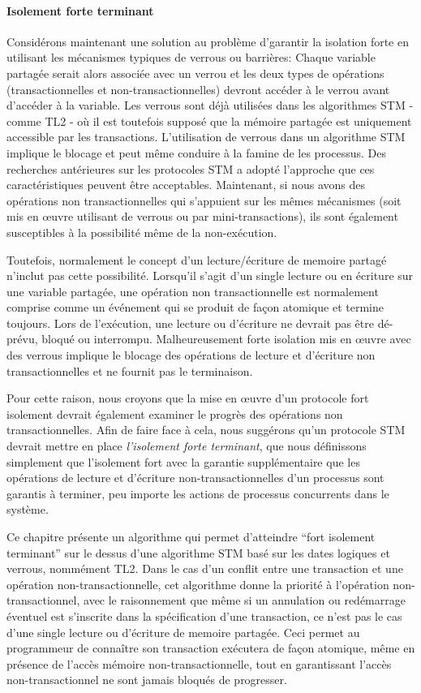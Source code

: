 \paragraph{Isolement forte terminant}

Considérons maintenant une solution au problème d'garantir la isolation forte en utilisant les mécanismes typiques de verrous ou barrières:
Chaque variable partagée serait alors associée avec un verrou et les deux types de opérations (transactionnelles et non-transactionnelles) devront accéder à le verrou avant d'accéder à la variable.
Les verrous sont déjà utilisées dans les algorithmes STM - comme TL2 \cite{DSS06} - où il est toutefois supposé que la mémoire partagée est uniquement accessible par les transactions.
L'utilisation de verrous dans un algorithme STM implique le blocage et peut même conduire à la famine de les processus.
Des recherches antérieures sur les protocoles STM a adopté l'approche que ces caractéristiques peuvent être acceptables.
Maintenant, si nous avons des opérations non transactionnelles qui s'appuient sur ​​les mêmes mécanismes (soit mis en œuvre utilisant de verrous ou par mini-transactions),
ils sont également susceptibles à la possibilité même de la non-exécution.


Toutefois, normalement le concept d'un lecture/écriture de memoire partagé n'inclut pas cette possibilité.
Lorsqu'il s'agit d'un single lecture ou en écriture sur une variable partagée, une opération non transactionnelle est normalement comprise comme un événement qui se produit de façon atomique et termine toujours.
Lors de l'exécution, une lecture ou d'écriture ne devrait pas être dé-prévu, bloqué ou interrompu.
Malheureusement forte isolation mis en œuvre avec des verrous implique le blocage des opérations de lecture et d'écriture non transactionnelles et ne fournit pas le terminaison.



Pour cette raison, nous croyons que la mise en œuvre d'un protocole fort isolement devrait également examiner le progrès des opérations non transactionnelles.
Afin de faire face à cela, nous suggérons qu'un protocole STM devrait mettre en place \emph{l'isolement forte terminant},
que nous définissons simplement que l'isolement fort avec la garantie supplémentaire que les opérations de lecture et d'écriture non-transactionnelles d'un processus sont garantis à terminer,
peu importe les actions de processus concurrents dans le système.


Ce chapitre présente un algorithme qui permet d'atteindre ``fort isolement terminant'' sur le dessus d'une algorithme STM basé sur les dates logiques et verrous, nommément TL2.
Dans le cas d'un conflit entre une transaction et une opération non-transactionnelle, cet algorithme donne la priorité à l'opération non-transactionnel,
avec le raisonnement que même si un annulation ou redémarrage éventuel est s'inscrite dans la spécification d'une transaction, ce n'est pas le cas d'une single lecture ou d'écriture de memoire partagée.
Ceci permet au programmeur de connaître son transaction exécutera de façon atomique, même en présence de l'accès mémoire non-transactionnelle,
tout en garantissant l'accès non-transactionnel ne sont jamais bloqués de progresser.



